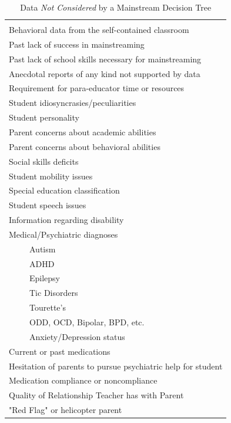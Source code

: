 \documentclass[twoside]{article}
\begin{document}
\begin{table}[tbp]
\centering
\caption{Data \textit{Not Considered} by a Mainstream Decision Tree}
\label{tab2}
\begin{tabular}{l}
\hline\\
Behavioral data from the self-contained classroom\\
Past lack of success in mainstreaming\\
Past lack of school skills necessary for mainstreaming\\
Anecdotal reports of any kind not supported by data\\
Requirement for para-educator time or resources\\
Student idiosyncrasies/peculiarities\\
Student personality\\
Parent concerns about academic abilities\\
Parent concerns about behavioral abilities\\
Social skills deficits\\
Student mobility issues\\
Special education classification\\
Student speech issues\\
Information regarding disability\\
Medical/Psychiatric diagnoses\\
~~~~~Autism\\
~~~~~ADHD\\
~~~~~Epilepsy\\
~~~~~Tic Disorders\\
~~~~~Tourette's\\
~~~~~ODD, OCD, Bipolar, BPD, etc.\\
~~~~~Anxiety/Depression status \\
Current or past medications\\
Hesitation of parents to pursue psychiatric help for student\\
Medication compliance or noncompliance\\
Quality of Relationship Teacher has with Parent\\
"Red Flag" or helicopter parent \\
\hline
\end{tabular}
\end{table}
%
%
%
%
%
%
%
\end{document}
